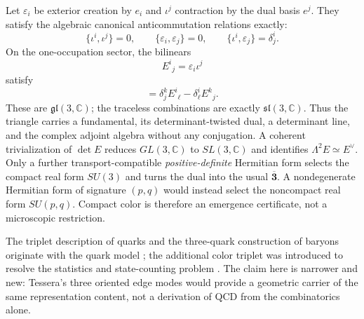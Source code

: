\documentclass[11pt,letterpaper]{article}
\begin{document}
Let $\varepsilon_i$ be exterior creation by $e_i$ and $\iota^j$ contraction by
the dual basis $e^j$. They satisfy the algebraic canonical anticommutation
relations exactly:
\begin{equation*}
  \{\iota^i,\iota^j\}=0,\qquad
  \{\varepsilon_i,\varepsilon_j\}=0,\qquad
  \{\iota^i,\varepsilon_j\}=\delta^i_j.
\end{equation*}
On the one-occupation sector, the bilinears
\begin{equation*}
  E^i{}_j=\varepsilon_i\iota^j
\end{equation*}
satisfy
\begin{equation*}
  [E^i{}_j,E^k{}_\ell]
  =\delta^k_jE^i{}_\ell-\delta^i_\ell E^k{}_j.
\end{equation*}
These are $\mathfrak{gl}(3,\mathbb C)$; the traceless combinations are exactly
$\mathfrak{sl}(3,\mathbb C)$. Thus the triangle carries a fundamental, its
determinant-twisted dual, a determinant line, and the complex adjoint algebra
without any conjugation. A coherent trivialization of $\det E$ reduces
$GL(3,\mathbb C)$ to $SL(3,\mathbb C)$ and identifies
$\Lambda^2E\simeq E^\vee$. Only a further transport-compatible
\emph{positive-definite} Hermitian form selects the compact real form $SU(3)$
and turns the dual into the usual $\overline{\mathbf3}$. A nondegenerate
Hermitian form of signature $(p,q)$ would instead select the noncompact real
form $SU(p,q)$. Compact color is therefore an emergence certificate, not a
microscopic restriction.

The triplet description of quarks and the three-quark construction of baryons
originate with the quark model \cite{gellmann1964}; the additional color
triplet was introduced to resolve the statistics and state-counting problem
\cite{hannambu1965,greenberg1964}. The claim here is narrower and new:
Tessera's three oriented edge modes would provide a geometric carrier of the
same representation content, not a derivation of QCD from the combinatorics
alone.
\end{document}
